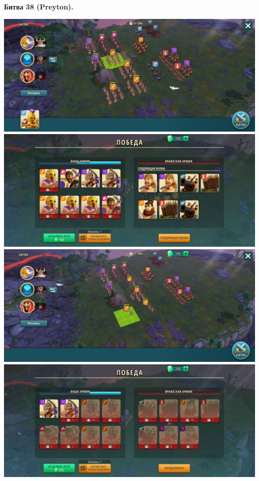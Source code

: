 \newpage
\begin{center}
	\hypertarget{fight38}{\textbf{Битва 38 (Preyton).}}
\end{center}
\noindent\includegraphics[width=\linewidth]{./parts/media/TreasureHunt/38/Preyton/38.1.jpg} \newline
\noindent\includegraphics[width=\linewidth]{./parts/media/TreasureHunt/38/Preyton/38_1.jpg} \newline
\noindent\includegraphics[width=\linewidth]{./parts/media/TreasureHunt/38/Preyton/38.2.jpg} \newline
\noindent\includegraphics[width=\linewidth]{./parts/media/TreasureHunt/38/Preyton/38_2.jpg} \newline

